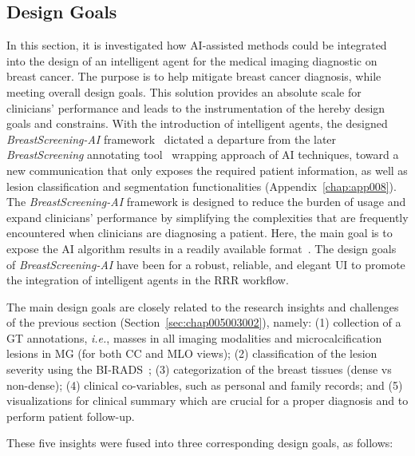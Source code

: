 \subsection{Design Goals}
\label{sec:chap005003004}

In this section, it is investigated how \ac{AI}-assisted methods could be integrated into the design of an intelligent agent for the medical imaging diagnostic on breast cancer.
The purpose is to help mitigate breast cancer diagnosis, while meeting overall design goals.
This solution provides an absolute scale for clinicians' performance and leads to the instrumentation of the hereby design goals and constrains.
With the introduction of intelligent agents, the designed {\it BreastScreening-AI} framework~\cite{CALISTO2021102607} dictated a departure from the later {\it BreastScreening} annotating tool~\cite{10.1145/3399715.3399744} wrapping approach of \ac{AI} techniques, toward a new communication that only exposes the required patient information, as well as lesion classification and segmentation functionalities (Appendix~\ref{chap:app008}).
The {\it BreastScreening-AI} framework is designed to reduce the burden of usage and expand clinicians' performance by simplifying the complexities that are frequently encountered when clinicians are diagnosing a patient.
Here, the main goal is to expose the \ac{AI} algorithm results in a readily available format~\cite{CALISTO2022102285}.
The design goals of {\it BreastScreening-AI} have been for a robust, reliable, and elegant \ac{UI} to promote the integration of intelligent agents in the \ac{RRR} workflow.

The main design goals are closely related to the research insights and challenges of the previous section (Section~\ref{sec:chap005003002}), namely:
(1) collection of a \ac{GT} annotations, {\it i.e.}, masses in all imaging modalities and microcalcification lesions in \ac{MG} (for both \ac{CC} and \ac{MLO} views);
(2) classification of the lesion severity using the \ac{BI-RADS}~\cite{aghaei2018association};
(3) categorization of the breast tissues (dense vs non-dense);
(4) clinical co-variables, such as personal and family records; and
(5) visualizations for clinical summary which are crucial for a proper diagnosis and to perform patient follow-up.

\noindent
These five insights were fused into three corresponding design goals, as follows:

\vspace{1.00mm}

